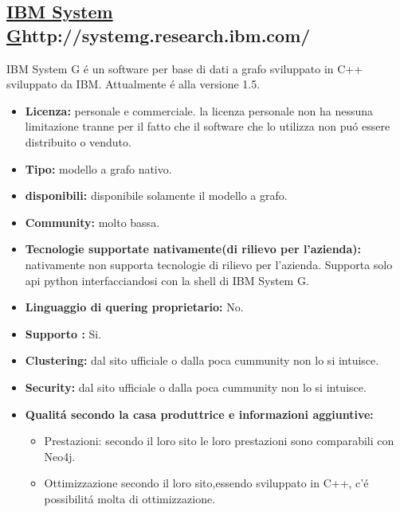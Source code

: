 \subsection{\url{IBM System G}{http://systemg.research.ibm.com/}}
IBM System G \'e un software per base di dati a grafo sviluppato in C++ sviluppato da IBM. Attualmente \'e alla versione 1.5.
\begin{itemize}
\item \textbf{Licenza:} personale e commerciale. la licenza personale non ha nessuna limitazione tranne per il fatto che il software che lo utilizza non pu\'o essere distribuito o venduto.
\item \textbf{Tipo:} modello a grafo nativo.
\item \textbf{ disponibili:} disponibile solamente il modello a grafo.
\item \textbf{Community:} molto bassa.
\item \textbf{Tecnologie supportate nativamente(di rilievo per l'azienda):} nativamente non supporta tecnologie di rilievo per l'azienda. Supporta solo api python interfacciandosi con la shell di IBM System G.
\item\textbf{Linguaggio di quering proprietario:} No.
\item\textbf{Supporto :} Si.

\item\textbf{Clustering:} dal sito ufficiale o dalla poca cummunity non lo si intuisce.
\item\textbf{Security:}  dal sito ufficiale o dalla poca cummunity non lo si intuisce.
\item\textbf{Qualit\'a secondo la casa produttrice e informazioni aggiuntive:} 
\begin{itemize}
\item{Prestazioni:} secondo il loro sito le loro prestazioni sono comparabili con Neo4j.
\item{Ottimizzazione} secondo il loro sito,essendo sviluppato in C++, c'\'e possibilit\'a molta di ottimizzazione.
\end{itemize}
\end{itemize}


